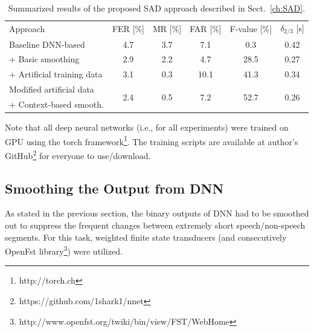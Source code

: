 \documentclass[FM,noheader,EN,bwtitles]{tulthesis}
\begin{document}
\begin{table}
\caption{Summarized results of the proposed SAD approach described in Sect.~\ref{ch:SAD}.} \label{table:base}
\centering
\begin{tabular}{lccccc}
\hline
\noalign{\smallskip}
 Approach & FER [\%] & MR [\%] & FAR [\%] & F-value [\%] & $\delta_{2/3}$ [s] \\
\noalign{\smallskip}
\hline
\noalign{\smallskip}
 Baseline DNN-based & 4.7 & 3.7 & 7.1 & 0.3 & 0.42 \\
 + Basic smoothing  & 2.9 & 2.2 & 4.7 & 28.5 & 0.27 \\
 + Artificial training data & 3.1 & 0.3 & 10.1 & 41.3 & 0.34 \\
 Modified artificial data & \multirow{2}{*}{2.4} & \multirow{2}{*}{0.5} & \multirow{2}{*}{7.2} & \multirow{2}{*}{52.7} & \multirow{2}{*}{0.26} \\
 + Context-based smooth. &&&&& \\
\hline
\end{tabular}
\end{table}

Note that all deep neural networks (i.e., for all experiments) were trained on GPU using the torch framework\footnote{http://torch.ch}.
The training scripts are available at author's GitHub\footnote{https://github.com/1shark1/nnet} for everyone to use/download.


\subsection{Smoothing the Output from DNN}
\label{ss:SADsmoothing}
As stated in the previous section, the binary outputs of DNN had to be smoothed out to suppress the frequent changes between extremely short speech/non-speech segments.
For this task, weighted finite state transducers (and consecutively OpenFst library\footnote{http://www.openfst.org/twiki/bin/view/FST/WebHome}) were utilized.
\end{document}
